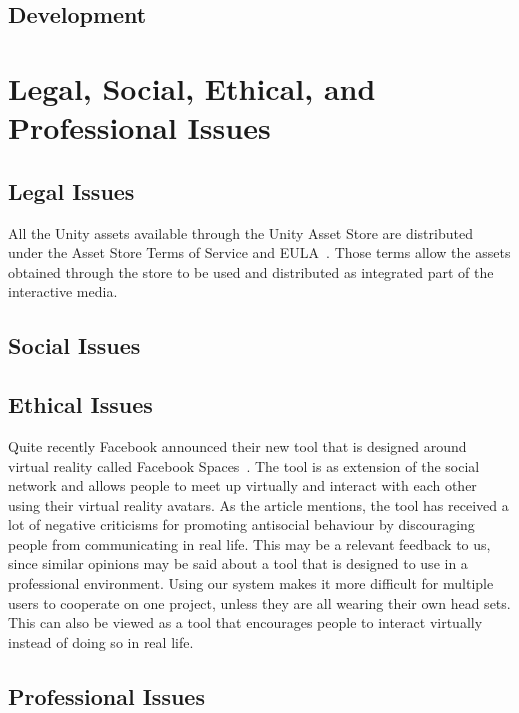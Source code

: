     \subsection{Development}

\section{Legal, Social, Ethical, and Professional Issues}

    \subsection{Legal Issues}
    \label{sec:legal}
        All the Unity assets available through the Unity Asset Store are distributed under the Asset Store Terms of Service and EULA~\cite{unity:terms}. Those terms allow the assets obtained through the store to be used and distributed as integrated part of the interactive media.
        
    \subsection{Social Issues}
    
    \subsection{Ethical Issues}
        Quite recently Facebook announced their new tool that is designed around virtual reality called Facebook Spaces~\cite{facebook2017}. The tool is as extension of the social network and allows people to meet up virtually and interact with each other using their virtual reality avatars. As the article mentions, the tool has received a lot of negative criticisms for promoting antisocial behaviour by discouraging people from communicating in real life. This may be a relevant feedback to us, since similar opinions may be said about a tool that is designed to use in a professional environment. Using our system makes it more difficult for multiple users to cooperate on one project, unless they are all wearing their own head sets. This can also be viewed as a tool that encourages people to interact virtually instead of doing so in real life.
        
    \subsection{Professional Issues}